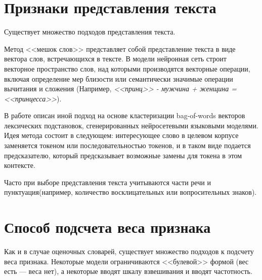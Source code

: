 \section{Признаки представления текста}
Существует множество подходов представления текста.

Метод <<мешок слов>> представляет собой представление текста в виде вектора слов, встречающихся в тексте. В модели \cite{bw1} нейронная сеть строит векторное пространство слов, над которыми производятся векторные операции, включая определение мер близости или семантически значимые операции вычитания и сложения (Например, \textit{<<принц>> - мужчина + женщина = <<принцесса>>}).

В работе \cite{bw2} описан иной подход на основе кластеризации bag-of-words векторов лексических подстановок, сгенерированных нейросетевыми языковыми моделями. Идея метода состоит в следующем: интересующее слово в целевом корпусе заменяется токеном или последовательностью токенов, и в таком виде подается предсказателю, который  предсказывает возможные замены для токена в этом контексте. 

Часто при выборе представления текста учитываются части речи и пунктуация(например, количество восклицательных или вопросительных знаков).

\section{Способ подсчета веса признака}
Как и в случае оценочных словарей, существует множество подходов к подсчету веса признака. Некоторые модели ограничиваются <<булевой>> формой (вес есть --- веса нет), а некоторые вводят шкалу взвешивания и вводят частотность.

